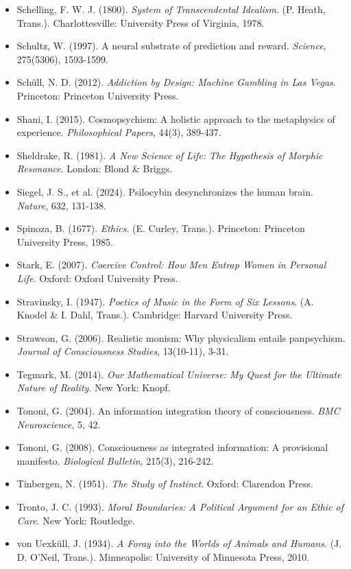 \begin{itemize}[nosep,leftmargin=*]
  \item Schelling, F. W. J. (1800). \textit{System of Transcendental Idealism}. (P. Heath, Trans.). Charlottesville: University Press of Virginia, 1978.
  \item Schultz, W. (1997). A neural substrate of prediction and reward. \textit{Science}, 275(5306), 1593-1599.
  \item Schüll, N. D. (2012). \textit{Addiction by Design: Machine Gambling in Las Vegas}. Princeton: Princeton University Press.
  \item Shani, I. (2015). Cosmopsychism: A holistic approach to the metaphysics of experience. \textit{Philosophical Papers}, 44(3), 389-437.
  \item Sheldrake, R. (1981). \textit{A New Science of Life: The Hypothesis of Morphic Resonance}. London: Blond \& Briggs.
  \item Siegel, J. S., et al. (2024). Psilocybin desynchronizes the human brain. \textit{Nature}, 632, 131-138.
  \item Spinoza, B. (1677). \textit{Ethics}. (E. Curley, Trans.). Princeton: Princeton University Press, 1985.
  \item Stark, E. (2007). \textit{Coercive Control: How Men Entrap Women in Personal Life}. Oxford: Oxford University Press.
  \item Stravinsky, I. (1947). \textit{Poetics of Music in the Form of Six Lessons}. (A. Knodel \& I. Dahl, Trans.). Cambridge: Harvard University Press.
  \item Strawson, G. (2006). Realistic monism: Why physicalism entails panpsychism. \textit{Journal of Consciousness Studies}, 13(10-11), 3-31.
  \item Tegmark, M. (2014). \textit{Our Mathematical Universe: My Quest for the Ultimate Nature of Reality}. New York: Knopf.
  \item Tononi, G. (2004). An information integration theory of consciousness. \textit{BMC Neuroscience}, 5, 42.
  \item Tononi, G. (2008). Consciousness as integrated information: A provisional manifesto. \textit{Biological Bulletin}, 215(3), 216-242.
  \item Tinbergen, N. (1951). \textit{The Study of Instinct}. Oxford: Clarendon Press.
  \item Tronto, J. C. (1993). \textit{Moral Boundaries: A Political Argument for an Ethic of Care}. New York: Routledge.
  \item von Uexküll, J. (1934). \textit{A Foray into the Worlds of Animals and Humans}. (J. D. O'Neil, Trans.). Minneapolis: University of Minnesota Press, 2010.

\end{itemize}
